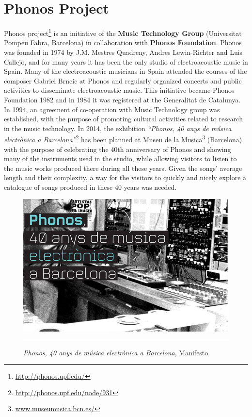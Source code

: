 
\section{Phonos Project}
Phonos project\footnote{\url{http://phonos.upf.edu/}} is an initiative of the \textbf{Music Technology Group} (Universitat Pompeu Fabra, Barcelona) in collaboration with \textbf{Phonos Foundation}. Phonos was founded in 1974 by J.M. Mestres Quadreny, Andres Lewin-Richter and Luis Callejo, and for many years it has been the only studio of electroacoustic music in Spain. Many of the electroacoustic musicians in Spain attended the courses of the composer Gabriel Brncic at Phonos and regularly organized concerts and public activities to disseminate electroacoustic music. This initiative became Phonos Foundation 1982 and in 1984 it was registered at the Generalitat de Catalunya. In 1994, an agreement of co-operation with Music Technology group was established, with the purpose of promoting cultural activities related to research in the music technology. 
In 2014, the exhibition \textit{``Phonos, 40 anys de música electrònica a Barcelona''}\footnote{\url{http://phonos.upf.edu/node/931}} has been planned at Museu de la Musica\footnote{\url{www.museumusica.bcn.es/}} (Barcelona) with the purpose of celebrating the 40th anniversary of Phonos and showing many of the instruments used in the studio, while allowing visitors to listen to the music works produced there during all these years. Given the songs' average length and their complexity, a way for the visitors to quickly and nicely explore a catalogue of songs produced in these 40 years was needed.


\begin{figure}[htbp]
  \centering
    \includegraphics[scale=0.6]{Figures/electronicmusicexhibition.jpg}
    \rule{35em}{0.5pt}
  \caption[Phonos, 40 anys de música electrònica a Barcelona]{\textit{Phonos, 40 anys de música electrònica a Barcelona}, Manifesto.}
  \label{fig:phonosmanifesto}
\end{figure}

